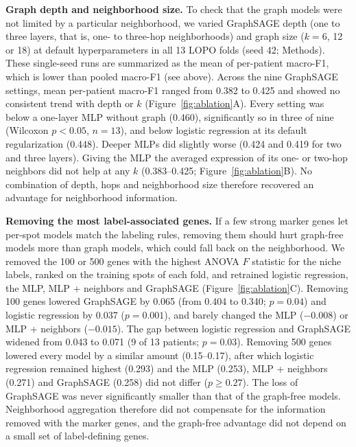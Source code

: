 \documentclass[11pt,letterpaper]{article}
\begin{document}
\textbf{Graph depth and neighborhood size.} To check that the graph models were not limited by a particular neighborhood, we varied GraphSAGE depth (one to three layers, that is, one- to three-hop neighborhoods) and graph size ($k = 6$, 12 or 18) at default hyperparameters in all 13 LOPO folds (seed 42; Methods). These single-seed runs are summarized as the mean of per-patient macro-F1, which is lower than pooled macro-F1 (see above). Across the nine GraphSAGE settings, mean per-patient macro-F1 ranged from 0.382 to 0.425 and showed no consistent trend with depth or $k$ (Figure~\ref{fig:ablation}A). Every setting was below a one-layer MLP without graph (0.460), significantly so in three of nine (Wilcoxon $p < 0.05$, $n = 13$), and below logistic regression at its default regularization (0.448). Deeper MLPs did slightly worse (0.424 and 0.419 for two and three layers). Giving the MLP the averaged expression of its one- or two-hop neighbors did not help at any $k$ (0.383--0.425; Figure~\ref{fig:ablation}B). No combination of depth, hops and neighborhood size therefore recovered an advantage for neighborhood information.

\textbf{Removing the most label-associated genes.} If a few strong marker genes let per-spot models match the labeling rules, removing them should hurt graph-free models more than graph models, which could fall back on the neighborhood. We removed the 100 or 500 genes with the highest ANOVA $F$ statistic for the niche labels, ranked on the training spots of each fold, and retrained logistic regression, the MLP, MLP + neighbors and GraphSAGE (Figure~\ref{fig:ablation}C). Removing 100 genes lowered GraphSAGE by 0.065 (from 0.404 to 0.340; $p = 0.04$) and logistic regression by 0.037 ($p = 0.001$), and barely changed the MLP ($-0.008$) or MLP + neighbors ($-0.015$). The gap between logistic regression and GraphSAGE widened from 0.043 to 0.071 (9 of 13 patients; $p = 0.03$). Removing 500 genes lowered every model by a similar amount (0.15--0.17), after which logistic regression remained highest (0.293) and the MLP (0.253), MLP + neighbors (0.271) and GraphSAGE (0.258) did not differ ($p \ge 0.27$). The loss of GraphSAGE was never significantly smaller than that of the graph-free models. Neighborhood aggregation therefore did not compensate for the information removed with the marker genes, and the graph-free advantage did not depend on a small set of label-defining genes.
\end{document}

